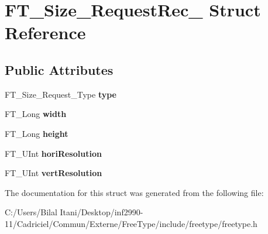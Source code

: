 \hypertarget{struct_f_t___size___request_rec__}{}\section{F\+T\+\_\+\+Size\+\_\+\+Request\+Rec\+\_\+ Struct Reference}
\label{struct_f_t___size___request_rec__}
\subsection*{Public Attributes}
\begin{DoxyCompactItemize}
\item 
F\+T\+\_\+\+Size\+\_\+\+Request\+\_\+\+Type {\bfseries type}\hypertarget{struct_f_t___size___request_rec___a7644b04dd2b26c0698df558775320494}{}\label{struct_f_t___size___request_rec___a7644b04dd2b26c0698df558775320494}

\item 
F\+T\+\_\+\+Long {\bfseries width}\hypertarget{struct_f_t___size___request_rec___a7b044d36af318b053d5e3939eb0d5039}{}\label{struct_f_t___size___request_rec___a7b044d36af318b053d5e3939eb0d5039}

\item 
F\+T\+\_\+\+Long {\bfseries height}\hypertarget{struct_f_t___size___request_rec___af8142450d8d032e1870d758cdcfa51a9}{}\label{struct_f_t___size___request_rec___af8142450d8d032e1870d758cdcfa51a9}

\item 
F\+T\+\_\+\+U\+Int {\bfseries hori\+Resolution}\hypertarget{struct_f_t___size___request_rec___a3a85704d13561d9db53aa60f7805ec73}{}\label{struct_f_t___size___request_rec___a3a85704d13561d9db53aa60f7805ec73}

\item 
F\+T\+\_\+\+U\+Int {\bfseries vert\+Resolution}\hypertarget{struct_f_t___size___request_rec___a86601c38d91064b6efe256a9e99c56f4}{}\label{struct_f_t___size___request_rec___a86601c38d91064b6efe256a9e99c56f4}

\end{DoxyCompactItemize}


The documentation for this struct was generated from the following file\+:\begin{DoxyCompactItemize}
\item 
C\+:/\+Users/\+Bilal Itani/\+Desktop/inf2990-\/11/\+Cadriciel/\+Commun/\+Externe/\+Free\+Type/include/freetype/freetype.\+h\end{DoxyCompactItemize}
